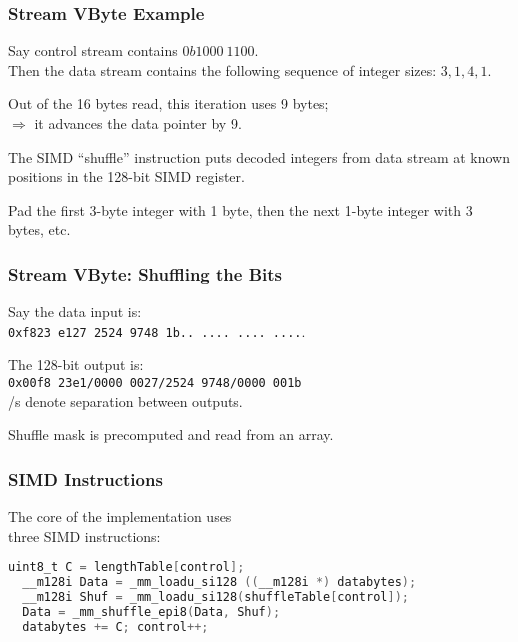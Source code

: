 \begin{frame}
\frametitle{Stream VByte Example}


Say control stream contains $0b1000~1100$. \\
Then the data stream
contains the following sequence of integer sizes: $3, 1, 4, 1$. 

Out of the 16 bytes read,
this iteration uses 9 bytes; \\
\hspace*{2em} $\Rightarrow$ it advances the data pointer by 9. 

The SIMD
``shuffle'' instruction puts decoded integers from data stream at known positions in the
128-bit SIMD register.

Pad the first 3-byte integer with 1 byte, then
the next 1-byte integer with 3 bytes, etc. 

\end{frame}

\begin{frame}
\frametitle{Stream VByte: Shuffling the Bits}
\vspace*{-1em}

Say the data input is:\\
{\tt 0xf823~e127~2524~9748~1b..~....~....~....}. 

The 128-bit output is:\\
{\tt 0x00f8~23e1/0000~0027/2524 9748/0000~001b}\\
/s denote separation
between outputs. 

Shuffle mask is precomputed and
read from an array.

\end{frame}

\begin{frame}[fragile]
\frametitle{SIMD Instructions}

\vspace*{-1em}

The core of the implementation uses\\
three SIMD instructions:
\begin{lstlisting}[language=C]
  uint8_t C = lengthTable[control];
  __m128i Data = _mm_loadu_si128 ((__m128i *) databytes);
  __m128i Shuf = _mm_loadu_si128(shuffleTable[control]);
  Data = _mm_shuffle_epi8(Data, Shuf);
  databytes += C; control++;
\end{lstlisting}

\end{frame}


